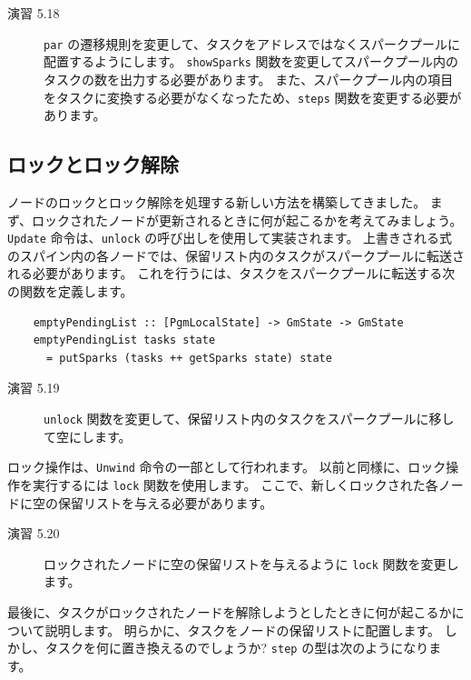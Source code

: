 \documentclass{jbook}
\begin{document}
\begin{description}
	\item[演習 5.18] \texttt{par} の遷移規則を変更して、タスクをアドレスではなくスパークプールに配置するようにします。
		\texttt{showSparks} 関数を変更してスパークプール内のタスクの数を出力する必要があります。
		また、スパークプール内の項目をタスクに変換する必要がなくなったため、\texttt{steps} 関数を変更する必要があります。
\end{description}

\subsection{ロックとロック解除}

ノードのロックとロック解除を処理する新しい方法を構築してきました。
まず、ロックされたノードが更新されるときに何が起こるかを考えてみましょう。
\texttt{Update} 命令は、\texttt{unlock} の呼び出しを使用して実装されます。
上書きされる式のスパイン内の各ノードでは、保留リスト内のタスクがスパークプールに転送される必要があります。
これを行うには、タスクをスパークプールに転送する次の関数を定義します。

\begin{verbatim}
    emptyPendingList :: [PgmLocalState] -> GmState -> GmState
    emptyPendingList tasks state
      = putSparks (tasks ++ getSparks state) state
\end{verbatim}

\begin{description}
	\item[演習 5.19] \texttt{unlock} 関数を変更して、保留リスト内のタスクをスパークプールに移して空にします。
\end{description}

ロック操作は、\texttt{Unwind} 命令の一部として行われます。
以前と同様に、ロック操作を実行するには \texttt{lock} 関数を使用します。
ここで、新しくロックされた各ノードに空の保留リストを与える必要があります。

\begin{description}
	\item[演習 5.20] ロックされたノードに空の保留リストを与えるように \texttt{lock} 関数を変更します。
\end{description}

最後に、タスクがロックされたノードを解除しようとしたときに何が起こるかについて説明します。
明らかに、タスクをノードの保留リストに配置します。
しかし、タスクを何に置き換えるのでしょうか?
\texttt{step} の型は次のようになります。
\end{document}
